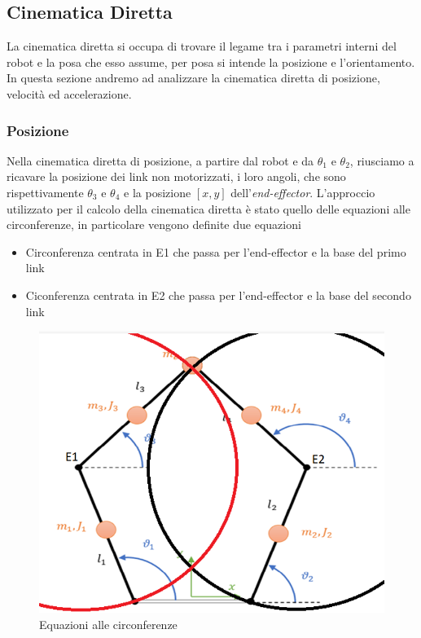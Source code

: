 \subsection{Cinematica Diretta}
La cinematica diretta si occupa di trovare il legame tra i parametri interni del robot e la posa che esso assume, per posa si intende la posizione e l'orientamento. In questa sezione andremo ad analizzare la cinematica diretta di posizione, velocità ed accelerazione.
\subsubsection{Posizione}\label{sec:Cinematica-pos}
Nella cinematica diretta di posizione, a partire dal robot e da $\theta_1$ e $\theta_2$, riusciamo a ricavare la posizione dei link non motorizzati, i loro angoli, che sono rispettivamente $\theta_3$ e $\theta_4$ e la posizione $[x,y]$ dell'\textit{end-effector}.
L'approccio utilizzato per il calcolo della cinematica diretta è stato quello delle equazioni alle circonferenze, in particolare vengono definite due equazioni
\begin{itemize}
	\item Circonferenza centrata in E1 che passa per l'end-effector e la base del primo link
	\item Ciconferenza centrata in E2 che passa per l'end-effector e la base del secondo link
\end{itemize}
\begin{figure}[ht]
	\begin{center}
		\includegraphics[scale=0.65]{Immagini/EqCirc}
		\caption{Equazioni alle circonferenze \label{fig:eqCirc}}
	\end{center}
\end{figure}
